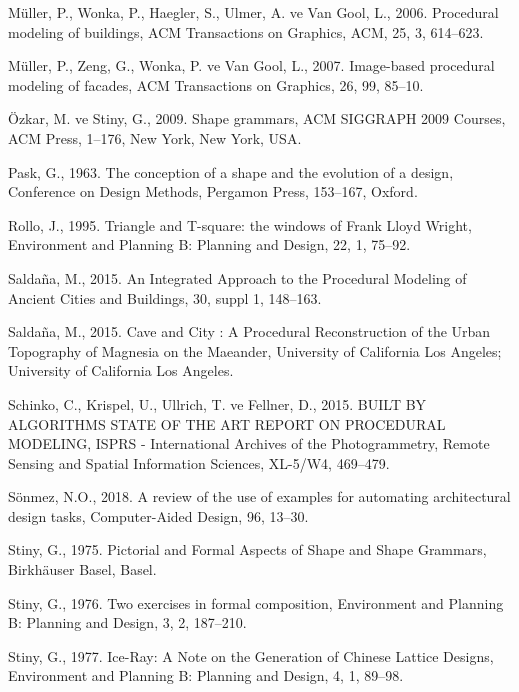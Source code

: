 \documentclass[12pt,turkish,a4paperpaper,]{report}
\begin{document}
\leavevmode\hypertarget{ref-Muller:2006fy}{}%
Müller, P., Wonka, P., Haegler, S., Ulmer, A. ve Van Gool, L., 2006.
Procedural modeling of buildings, ACM Transactions on Graphics, ACM, 25,
3, 614--623.

\leavevmode\hypertarget{ref-Muller:2007gu}{}%
Müller, P., Zeng, G., Wonka, P. ve Van Gool, L., 2007. Image-based
procedural modeling of facades, ACM Transactions on Graphics, 26, 99,
85--10.

\leavevmode\hypertarget{ref-Ozkar:2009ga}{}%
Özkar, M. ve Stiny, G., 2009. Shape grammars, ACM SIGGRAPH 2009 Courses,
ACM Press, 1--176, New York, New York, USA.

\leavevmode\hypertarget{ref-Pask:1963vc}{}%
Pask, G., 1963. The conception of a shape and the evolution of a design,
Conference on Design Methods, Pergamon Press, 153--167, Oxford.

\leavevmode\hypertarget{ref-Rollo:1995bz}{}%
Rollo, J., 1995. Triangle and T-square: the windows of Frank Lloyd
Wright, Environment and Planning B: Planning and Design, 22, 1, 75--92.

\leavevmode\hypertarget{ref-Saldana:2015el}{}%
Saldaña, M., 2015. An Integrated Approach to the Procedural Modeling of
Ancient Cities and Buildings, 30, suppl 1, 148--163.

\leavevmode\hypertarget{ref-Saldana:2015wj}{}%
Saldaña, M., 2015. Cave and City : A Procedural Reconstruction of the
Urban Topography of Magnesia on the Maeander, University of California
Los Angeles; University of California Los Angeles.

\leavevmode\hypertarget{ref-Schinko:2015gn}{}%
Schinko, C., Krispel, U., Ullrich, T. ve Fellner, D., 2015. BUILT BY
ALGORITHMS STATE OF THE ART REPORT ON PROCEDURAL MODELING, ISPRS -
International Archives of the Photogrammetry, Remote Sensing and Spatial
Information Sciences, XL-5/W4, 469--479.

\leavevmode\hypertarget{ref-Sonmez:2018jx}{}%
Sönmez, N.O., 2018. A review of the use of examples for automating
architectural design tasks, Computer-Aided Design, 96, 13--30.

\leavevmode\hypertarget{ref-Stiny:1975fj}{}%
Stiny, G., 1975. Pictorial and Formal Aspects of Shape and Shape
Grammars, Birkhäuser Basel, Basel.

\leavevmode\hypertarget{ref-Stiny:1976im}{}%
Stiny, G., 1976. Two exercises in formal composition, Environment and
Planning B: Planning and Design, 3, 2, 187--210.

\leavevmode\hypertarget{ref-Stiny:1977im}{}%
Stiny, G., 1977. Ice-Ray: A Note on the Generation of Chinese Lattice
Designs, Environment and Planning B: Planning and Design, 4, 1, 89--98.
\end{document}

